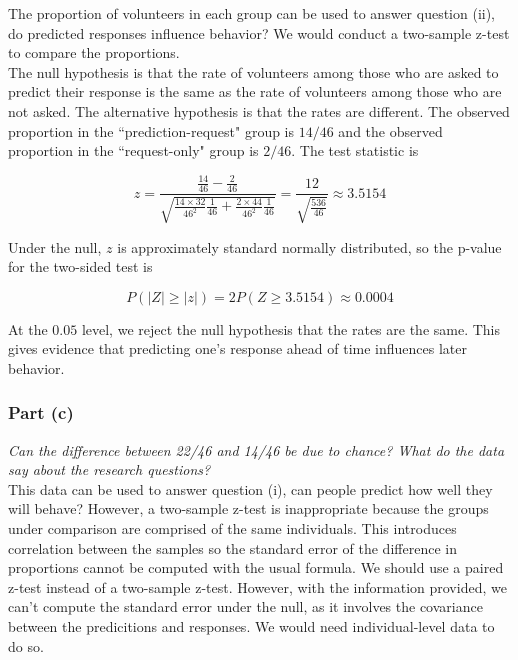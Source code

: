 \documentclass[11pt]{article}
\newcommand{\pr}{P} %
\begin{document}
The proportion of volunteers in each group can be used to answer question (ii), do predicted responses influence behavior?  We would conduct a two-sample z-test to compare the proportions. \\

The null hypothesis is that the rate of volunteers among those who are asked to predict their response is the same as the rate of volunteers among those who are not asked.  The alternative hypothesis is that the rates are different.  The observed proportion in the ``prediction-request" group is $14/46$ and the observed proportion in the ``request-only" group is $2/46$.  The test statistic is

$$z = \frac{ \frac{14}{46}-\frac{2}{46}}{ \sqrt{\frac{14\times32}{46^2}\frac{1}{46}+\frac{2\times 44}{46^2}\frac{1}{46} }} = \frac{ 12}{ \sqrt{\frac{536}{46}}} \approx  3.5154$$

Under the null, $z$ is approximately standard normally distributed, so the p-value for the two-sided test is

$$\pr( \lvert Z \rvert \geq \lvert z \rvert) = 2 \pr(Z \geq 3.5154) \approx 0.0004$$

At the $0.05$ level, we reject the null hypothesis that the rates are the same. This gives evidence that predicting one's response ahead of time influences later behavior.  \\




\subsubsection*{Part (c)}
\textit{Can the difference between 22/46 and 14/46 be due to chance? What do the data say about the research questions?}\\

This data can be used to answer question (i), can people predict how well they will behave?  However, a two-sample z-test is inappropriate because the groups under comparison are comprised of the same individuals.  This introduces correlation between the samples so the standard error of the difference in proportions cannot be computed with the usual formula.  We should use a paired z-test instead of a two-sample z-test.  However, with the information provided, we can't compute the standard error under the null, as it involves the covariance between the predicitions and responses.  We would need individual-level data to do so.  \\
\end{document}
